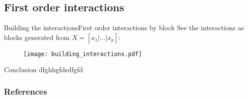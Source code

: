 \documentclass[10pt,aspectratio=43]{beamer}
\begin{document}
\subsection{First order interactions}
\begin{frame}{Building the interactions}{First order interactions by block}
See the interactions as blocks generated from $X=[x_1|\dots|x_p]$:
\begin{figure}[h]
    \centering
    \texttt{[image: building\_interactions.pdf]}
\end{figure}
\end{frame}



\begin{frame}{Conclusion}
    dfghhgfdsdfgfd
\end{frame}



\begin{frame}[allowframebreaks]{}
    \frametitle{References}
    
\end{frame}
\end{document}
